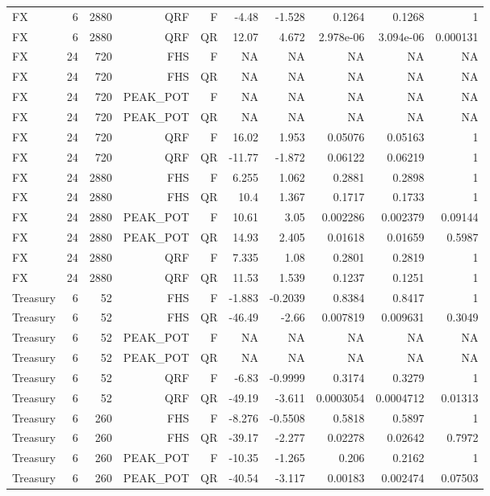 \documentclass[10pt,a4paper]{article}
\begin{document}
\begin{center}
\begin{minipage}{\linewidth}
\begin{tabular}{lrrrrrrrrr}
FX & 6 & 2880 & QRF & F & -4.48 & -1.528 & 0.1264 & 0.1268 & 1 \\
FX & 6 & 2880 & QRF & QR & 12.07 & 4.672 & 2.978e-06 & 3.094e-06 & 0.000131 \\
FX & 24 & 720 & FHS & F & NA & NA & NA & NA & NA \\
FX & 24 & 720 & FHS & QR & NA & NA & NA & NA & NA \\
FX & 24 & 720 & PEAK\_POT & F & NA & NA & NA & NA & NA \\
FX & 24 & 720 & PEAK\_POT & QR & NA & NA & NA & NA & NA \\
FX & 24 & 720 & QRF & F & 16.02 & 1.953 & 0.05076 & 0.05163 & 1 \\
FX & 24 & 720 & QRF & QR & -11.77 & -1.872 & 0.06122 & 0.06219 & 1 \\
FX & 24 & 2880 & FHS & F & 6.255 & 1.062 & 0.2881 & 0.2898 & 1 \\
FX & 24 & 2880 & FHS & QR & 10.4 & 1.367 & 0.1717 & 0.1733 & 1 \\
FX & 24 & 2880 & PEAK\_POT & F & 10.61 & 3.05 & 0.002286 & 0.002379 & 0.09144 \\
FX & 24 & 2880 & PEAK\_POT & QR & 14.93 & 2.405 & 0.01618 & 0.01659 & 0.5987 \\
FX & 24 & 2880 & QRF & F & 7.335 & 1.08 & 0.2801 & 0.2819 & 1 \\
FX & 24 & 2880 & QRF & QR & 11.53 & 1.539 & 0.1237 & 0.1251 & 1 \\
Treasury & 6 & 52 & FHS & F & -1.883 & -0.2039 & 0.8384 & 0.8417 & 1 \\
Treasury & 6 & 52 & FHS & QR & -46.49 & -2.66 & 0.007819 & 0.009631 & 0.3049 \\
Treasury & 6 & 52 & PEAK\_POT & F & NA & NA & NA & NA & NA \\
Treasury & 6 & 52 & PEAK\_POT & QR & NA & NA & NA & NA & NA \\
Treasury & 6 & 52 & QRF & F & -6.83 & -0.9999 & 0.3174 & 0.3279 & 1 \\
Treasury & 6 & 52 & QRF & QR & -49.19 & -3.611 & 0.0003054 & 0.0004712 & 0.01313 \\
Treasury & 6 & 260 & FHS & F & -8.276 & -0.5508 & 0.5818 & 0.5897 & 1 \\
Treasury & 6 & 260 & FHS & QR & -39.17 & -2.277 & 0.02278 & 0.02642 & 0.7972 \\
Treasury & 6 & 260 & PEAK\_POT & F & -10.35 & -1.265 & 0.206 & 0.2162 & 1 \\
Treasury & 6 & 260 & PEAK\_POT & QR & -40.54 & -3.117 & 0.00183 & 0.002474 & 0.07503 \\

\end{tabular}
\end{minipage}
\end{center}
\end{document}
